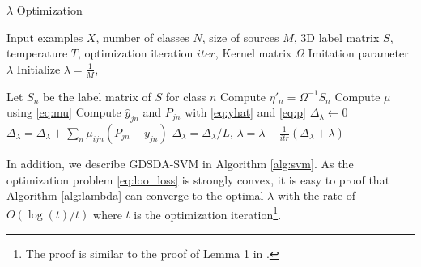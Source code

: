 \begin{algorithm}
	\caption{$\lambda$ Optimization}\label{alg:lambda}
\begin{algorithmic}
	\Require Input examples $X$, number of classes $N$, size of sources $M$, 3D label matrix $S$, temperature $T$, optimization iteration $iter$, Kernel matrix $\Omega$
    \Ensure Imitation parameter $\lambda$
    \State Initialize $\lambda = \frac{1}{M}$, 
    
    \State Let $S_n$ be the label matrix of $S$ for class $n$
    \State Compute $\eta'_n=\Omega^{-1}S_n$ 
    \EndFor
    \State Compute $\mu$ using \eqref{eq:mu}
	    \State Compute $\hat{y}_{jn}$ and $P_{jn}$ with \eqref{eq:yhat}  and \eqref{eq:p}
	    \State $\Delta_{\lambda} \leftarrow 0$
		    \State $\Delta_{\lambda} = \Delta_{\lambda}+\sum_n\mu_{ijn}\left(P_{jn}-{y}_{jn}\right)$
	    \EndFor
	    \State $\Delta_{\lambda} =\Delta_{\lambda}/L$, $\lambda = \lambda - \frac{1}{itr}(\Delta_{\lambda}+\lambda)$
    \EndFor
\end{algorithmic}	
\end{algorithm}
In addition, we describe GDSDA-SVM in Algorithm \ref{alg:svm}. As the optimization problem \eqref{eq:loo_loss} is strongly convex, it is easy to proof that Algorithm \ref{alg:lambda} can converge to the optimal $\lambda$ with the rate of $O(\log(t)/t)$ where $t$ is the optimization iteration\footnote{The proof is similar to the proof of Lemma 1 in \cite{shalev2011pegasos}.}. 




